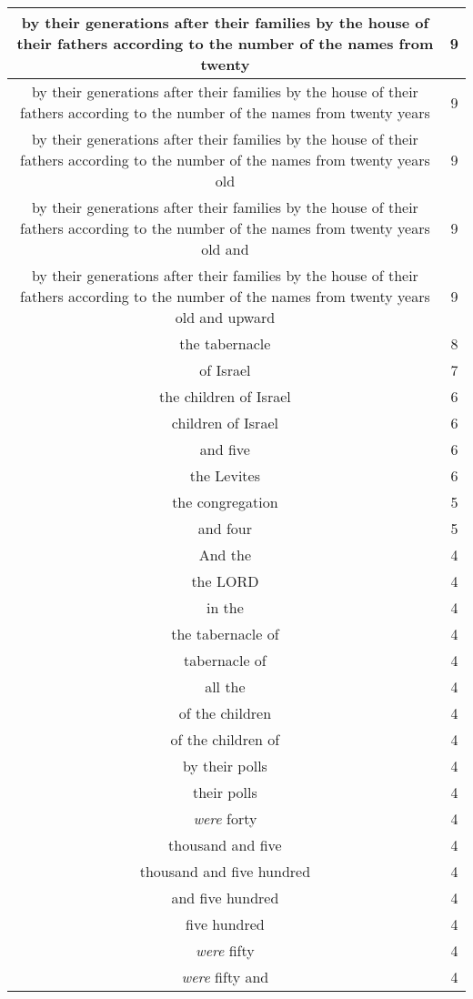 \begin{center}
\begin{longtable}{|c|c|}
by their generations after their families by the house of their fathers according to the number of the names from twenty & 9\\ \hline 
by their generations after their families by the house of their fathers according to the number of the names from twenty years & 9\\ \hline 
by their generations after their families by the house of their fathers according to the number of the names from twenty years old & 9\\ \hline 
by their generations after their families by the house of their fathers according to the number of the names from twenty years old and & 9\\ \hline 
by their generations after their families by the house of their fathers according to the number of the names from twenty years old and upward & 9\\ \hline 
the tabernacle & 8\\ \hline 
of Israel & 7\\ \hline 
the children of Israel & 6\\ \hline 
children of Israel & 6\\ \hline 
and five & 6\\ \hline 
the Levites & 6\\ \hline 
the congregation & 5\\ \hline 
and four & 5\\ \hline 
And the & 4\\ \hline 
the LORD & 4\\ \hline 
in the & 4\\ \hline 
the tabernacle of & 4\\ \hline 
tabernacle of & 4\\ \hline 
all the & 4\\ \hline 
of the children & 4\\ \hline 
of the children of & 4\\ \hline 
by their polls & 4\\ \hline 
their polls & 4\\ \hline 
\emph{were} forty & 4\\ \hline 
thousand and five & 4\\ \hline 
thousand and five hundred & 4\\ \hline 
and five hundred & 4\\ \hline 
five hundred & 4\\ \hline 
\emph{were} fifty & 4\\ \hline 
\emph{were} fifty and & 4\\ \hline 

\end{longtable}
\end{center}
